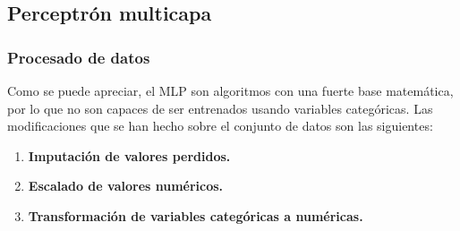 \subsection{Perceptrón multicapa}

\subsubsection*{Procesado de datos}
Como se puede apreciar, el MLP son algoritmos con una fuerte base matemática, por lo que no son capaces de ser entrenados usando variables categóricas. Las modificaciones que se han hecho sobre el conjunto de datos son las siguientes:
\begin{enumerate}
	\item \textbf{Imputación de valores perdidos.}
	\item \textbf{Escalado de valores numéricos.}
	\item \textbf{Transformación de variables categóricas a numéricas.}
\end{enumerate}
